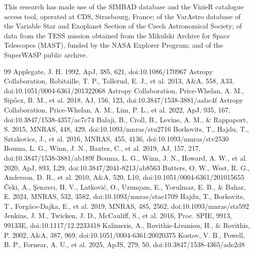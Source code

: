 \documentclass{aa}
\begin{document}
\begin{acknowledgements}
This research has made use of the SIMBAD database and the VizieR catalogue access tool, operated at CDS, Strasbourg, France; of the VarAstro database of the Variable Star and Exoplanet Section of the Czech Astronomical Society; of data from the TESS mission obtained from the Mikulski Archive for Space Telescopes (MAST), funded by the NASA Explorer Program; and of the SuperWASP public archive.
\end{acknowledgements}

\begin{thebibliography}{99}
 Applegate, J. H. 1992, ApJ, 385, 621, doi:10.1086/170967
 Astropy Collaboration, Robitaille, T. P., Tollerud, E. J., et al. 2013, A\&A, 558, A33, doi:10.1051/0004-6361/201322068
 Astropy Collaboration, Price-Whelan, A. M., Sipőcz, B. M., et al. 2018, AJ, 156, 123, doi:10.3847/1538-3881/aabc4f
 Astropy Collaboration, Price-Whelan, A. M., Lim, P. L., et al. 2022, ApJ, 935, 167, doi:10.3847/1538-4357/ac7c74
 Balaji, B., Croll, B., Levine, A. M., \& Rappaport, S. 2015, MNRAS, 448, 429, doi:10.1093/mnras/stu2716
 Borkovits, T., Hajdu, T., Sztakovics, J., et al. 2016, MNRAS, 455, 4136, doi:10.1093/mnras/stv2530
 Bouma, L. G., Winn, J. N., Baxter, C., et al. 2019, AJ, 157, 217, doi:10.3847/1538-3881/ab189f
 Bouma, L. G., Winn, J. N., Howard, A. W., et al. 2020, ApJ, 893, L29, doi:10.3847/2041-8213/ab8563
 Butters, O. W., West, R. G., Anderson, D. R., et al. 2010, A\&A, 520, L10, doi:10.1051/0004-6361/201015655
 Čeki, A., Şenavcı, H. V., Latković, O., Uzunçam, E., Yorulmaz, E. B., \& Bahar, E. 2024, MNRAS, 532, 3582, doi:10.1093/mnras/stae1709
 Hajdu, T., Borkovits, T., Forgács-Dajka, E., et al. 2019, MNRAS, 485, 2562, doi:10.1093/mnras/stz592
 Jenkins, J. M., Twicken, J. D., McCauliff, S., et al. 2016, Proc. SPIE, 9913, 99133E, doi:10.1117/12.2233418
 Kalimeris, A., Rovithis-Livaniou, H., \& Rovithis, P. 2002, A\&A, 387, 969, doi:10.1051/0004-6361:20020375
 Kostov, V. B., Powell, B. P., Fornear, A. U., et al. 2025, ApJS, 279, 50, doi:10.3847/1538-4365/ade2d8

\end{thebibliography}
\end{document}
